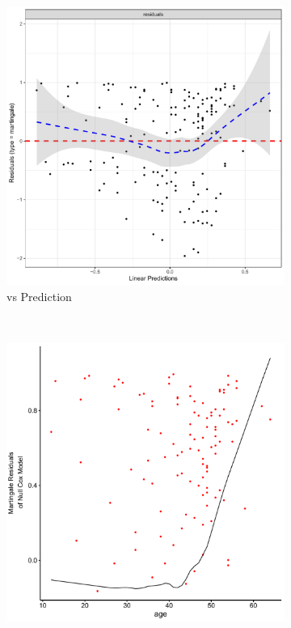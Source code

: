 \begin{figure}[H]
\centering
  \begin{subfigure}[c]{0.48\textwidth}\centering
  \includegraphics[width=\textwidth]{figures/survival/stanford_cox_age_martingale_residuals}
  \caption{vs Prediction}
  \label{fig:cox:martingale_residuals:prediction}
  \end{subfigure}
  ~
  \begin{subfigure}[c]{0.48\textwidth}\centering
  \includegraphics[width=\textwidth]{figures/survival/stanford_cox_age_martingale_residuals_age}

\end{subfigure}
\end{figure}
